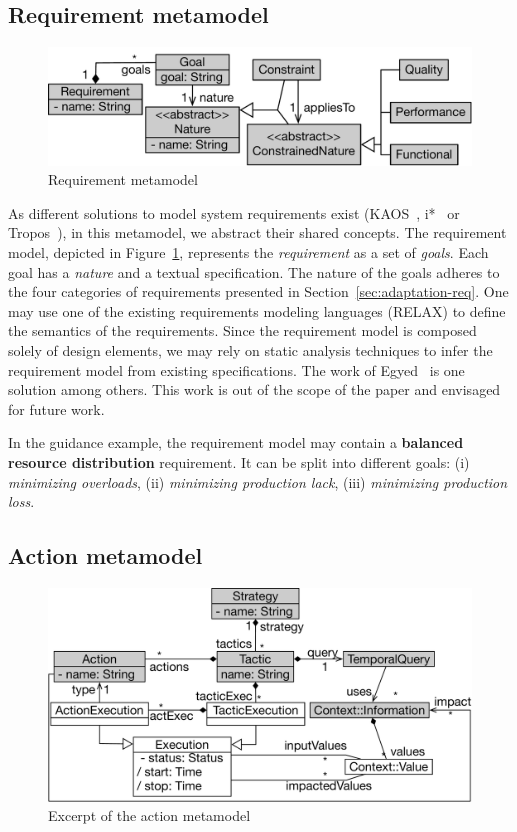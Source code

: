 \subsection{Requirement metamodel}

\begin{figure}
	\centering
	\includegraphics[width=0.7\linewidth]{img/chapt-tkm/mm/requirementModel}
	\caption{Requirement metamodel}
	\label{fig:requirement-model}
\end{figure}

As different solutions to model system requirements exist (\eg KAOS~\cite{dardenne1993goal}, i*~\cite{yu2011modelling} or Tropos~\cite{DBLP:journals/aamas/BrescianiPGGM04}), in this metamodel, we abstract their shared concepts.
The requirement model, depicted in Figure~\ref{fig:requirement-model}, represents the \textit{requirement} as a set of \textit{goals}.
Each goal has a \textit{nature} and a textual specification.
The nature of the goals adheres to the four categories of requirements presented in Section~\ref{sec:adaptation-req}.
One may use one of the existing requirements modeling languages (\eg RELAX) to define the semantics of the requirements. 
Since the requirement model is composed solely of design elements, we may rely on static analysis techniques to infer the requirement model from existing specifications.
The work of Egyed~\cite{egyed01} is one solution among others.
This work is out of the scope of the paper and envisaged for future work. 

In the guidance example, the requirement model may contain a \textbf{balanced resource distribution} requirement.
It can be split into different goals: (i) \textit{minimizing overloads}, (ii) \textit{minimizing production lack}, (iii) \textit{minimizing production loss}.

\subsection{Action metamodel}
\label{sec:action-mm}

\begin{figure}
	\centering
	\includegraphics[width=0.8\linewidth]{img/chapt-tkm/mm/actionModel}
	\caption{Excerpt of the action metamodel}
	\label{fig:action-mm}
\end{figure}

